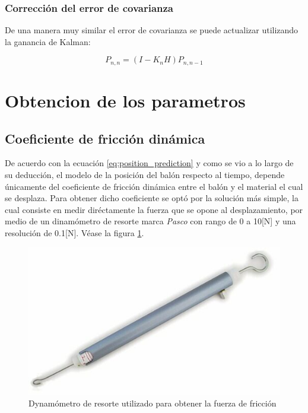 		\subsubsection*{Corrección del error de covarianza}
	De una manera muy similar el error de covarianza se puede actualizar utilizando la ganancia de Kalman:

\begin{equation}
P_{n,n} = (I - K_n H) P_{n,n-1}
\end{equation}

	\section{Obtencion de los parametros}
		\subsection*{Coeficiente de fricción dinámica}
	De acuerdo con la ecuación \ref{eq:position_prediction} y como se vio a lo largo de su deducción, el modelo de la posición del balón respecto al tiempo, depende únicamente del coeficiente de fricción dinámica entre el balón y el material el cual se desplaza. Para obtener dicho coeficiente se optó por la solución más simple, la cual consiste en medir diréctamente la fuerza que se opone al desplazamiento, por medio de un dinamómetro de resorte marca \textit{Pasco} con rango de 0 a 10[N] y una resolución de 0.1[N]. Véase la figura \ref{fig:dynamometer}. 
	
\begin{figure}
\centering
\includegraphics[scale=0.4]{images/dynamometer.jpg}
\caption{Dynamómetro de resorte utilizado para obtener la fuerza de fricción}
\label{fig:dynamometer}
\end{figure}	


